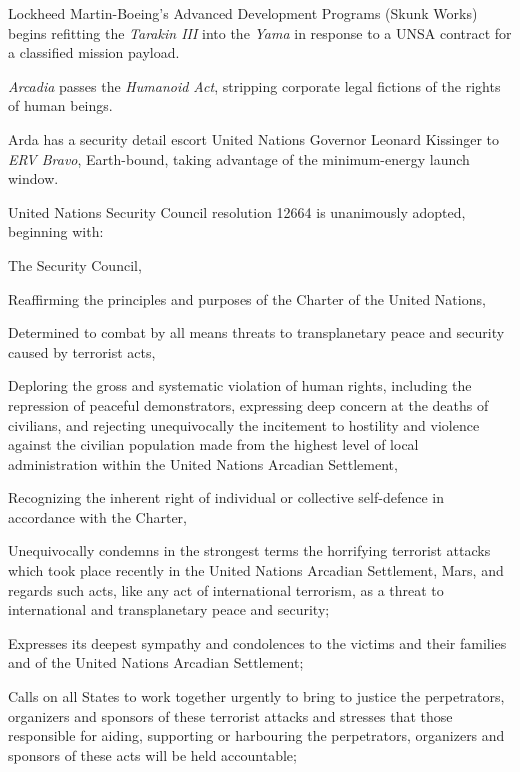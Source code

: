 Lockheed Martin-Boeing's Advanced Development Programs (Skunk Works) begins refitting the {\it Tarakin III} into the {\it Yama} in response to a UNSA contract for a classified mission payload.
\StopTimelineDate

{\it Arcadia} passes the {\it Humanoid Act}, stripping corporate legal fictions of the rights of human beings.
\StopTimelineDate

Arda has a security detail escort United Nations Governor Leonard Kissinger to {\it ERV Bravo}, Earth-bound, taking advantage of the minimum-energy launch window.
\StopTimelineDate

United Nations Security Council resolution 12664 is unanimously adopted, beginning with:

\startTimelineDocument
The Security Council,

Reaffirming the principles and purposes of the Charter of the United Nations,

Determined to combat by all means threats to transplanetary peace and security caused by terrorist acts,

Deploring the gross and systematic violation of human rights, including the repression of peaceful demonstrators, expressing deep concern at the deaths of civilians, and rejecting unequivocally the incitement to hostility and violence against the civilian population made from the highest level of local administration within the United Nations Arcadian Settlement,

Recognizing the inherent right of individual or collective self-defence in accordance with the Charter,

\startitemize[n]
\setupwhitespace[big]
\item Unequivocally condemns in the strongest terms the horrifying terrorist attacks which took place recently in the United Nations Arcadian Settlement, Mars, and regards such acts, like any act of international terrorism, as a threat to international and transplanetary peace and security;

\item Expresses its deepest sympathy and condolences to the victims and their families and of the United Nations Arcadian Settlement;

\item Calls on all States to work together urgently to bring to justice the perpetrators, organizers and sponsors of these terrorist attacks and stresses that those responsible for aiding, supporting or harbouring the perpetrators, organizers and sponsors of these acts will be held accountable;


